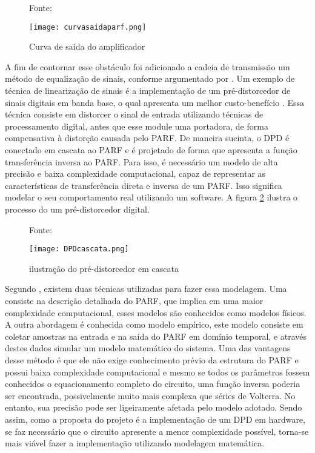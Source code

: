 \begin{figure}[ht!]
    \centering
    \captionsetup{justification=centering}
    \caption*{Fonte: \cite{Chavez2018}}
    \texttt{[image: curvasaidaparf.png]}
    \caption{Curva de saída do amplificador}
    \label{fig:saidaparf}
\end{figure}

A fim de contornar esse obstáculo foi adicionado a cadeia de transmissão um método de equalização de sinais, conforme argumentado por \cite{Kenington2000}. Um exemplo de técnica de linearização de sinais é a implementação de um pré-distorcedor de sinais digitais em banda base, o qual apresenta um melhor custo-benefício \cite{Kenington2000}. Essa técnica consiste em distorcer o sinal de entrada utilizando técnicas de processamento digital, antes que esse module uma portadora, de forma compensativa à distorção causada pelo PARF. De maneira sucinta, o DPD é conectado em cascata ao PARF e é projetado de forma que apresenta a função transferência inversa ao PARF. Para isso, é necessário um modelo de alta precisão e baixa complexidade computacional, capaz de representar as características de transferência direta e inversa de um PARF. Isso significa modelar o seu comportamento real utilizando um software.  A figura \ref{fig:cascatadpd} ilustra o processo do um pré-distorcedor digital.

\begin{figure}[h!]
    \centering
    \captionsetup{justification=centering}
    \caption*{Fonte: \cite{Chavez2018}}
    \texttt{[image: DPDcascata.png]}
    \caption{ilustração do pré-distorcedor em cascata}
    \label{fig:cascatadpd}
\end{figure}

Segundo \cite{John2016}, existem duas técnicas utilizadas para fazer essa modelagem. Uma consiste na descrição detalhada do PARF, que implica em uma maior complexidade computacional, esses modelos são conhecidos como modelos físicos. A outra abordagem é conhecida como modelo empírico, este modelo consiste em coletar amostras na entrada e na saída do PARF em domínio temporal, e através destes dados simular um modelo matemático do sistema. Uma das vantagens desse método é que ele não exige conhecimento prévio da estrutura do PARF e possui baixa complexidade computacional e mesmo se todos os parâmetros fossem conhecidos o equacionamento completo do circuito, uma função inversa poderia ser encontrada, possivelmente muito mais complexa que séries de Volterra. No entanto, sua precisão pode ser ligeiramente afetada pelo modelo adotado. 
Sendo assim, como a proposta do projeto é a implementação de um DPD em hardware, se faz necessário que o circuito apresente a menor complexidade possível,  torna-se mais viável fazer a implementação utilizando modelagem matemática. 

